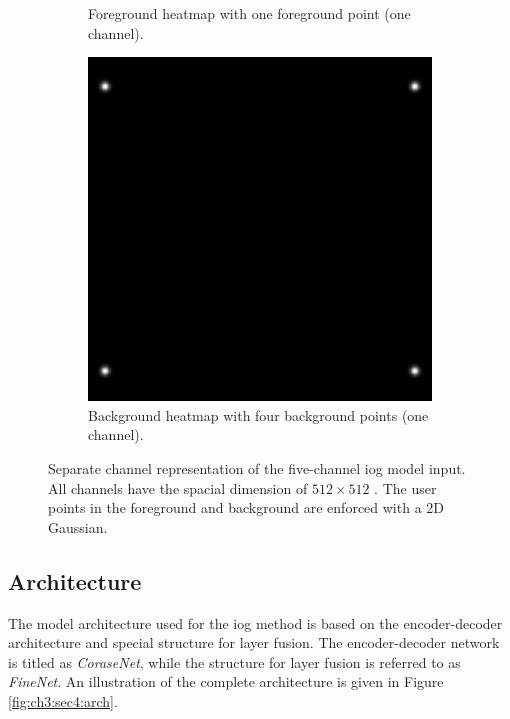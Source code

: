 \begin{figure}
\begin{subfigure}[b]{0.3\textwidth}
		\caption{Foreground heatmap with one foreground point (one channel).}
		\label{fig:ch3:sec4:fg_channel}
	\end{subfigure}
	\hfill
	\begin{subfigure}[b]{0.3\textwidth}
		\centering
		\includegraphics[width=\textwidth]{figures/chap34_channel_bg.png}
		\caption{Background heatmap with four background points (one channel).}
		\label{fig:ch3:sec4:bg_channel}
	\end{subfigure}
	\caption[Five-channel IOG model input]{
		Separate channel representation of the five-channel \gls{iog} model input.
		All channels have the spacial dimension of $512 \times 512$ .
		The user points in the foreground and background are enforced with a 2D Gaussian.
	} \label{fig:ch3:sec4:model_input_channels}
\end{figure}

\subsection{Architecture}\label{ord:ch3:sec4:subsec3}

The model architecture used for the \gls{iog} method is based on the encoder-decoder architecture and special structure for layer fusion.
The encoder-decoder network is titled as \textit{CoraseNet}, while the structure for layer fusion is referred to as \textit{FineNet}.
An illustration of the complete architecture is given in Figure \ref{fig:ch3:sec4:arch}.


